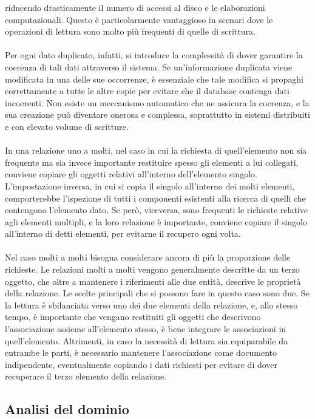 riducendo drasticamente il numero di accessi al disco e le elaborazioni computazionali. 
Questo è particolarmente vantaggioso in scenari
dove le operazioni di lettura sono molto più frequenti di quelle di scrittura.\\
\\
Per ogni dato duplicato, infatti, si introduce la complessità 
di dover garantire la coerenza di tali dati attraverso il sistema. 
Se un'informazione duplicata viene modificata in una delle sue occorrenze, 
è essenziale che tale modifica si propaghi correttamente a tutte le altre copie 
per evitare che il database contenga dati incoerenti.
Non esiste un meccanismo automatico che ne assicura la coerenza,
e la sua creazione può diventare onerosa e complessa, 
soprattutto in sistemi distribuiti e con elevato volume di scritture.\\
\\
In una relazione uno a molti, 
nel caso in cui la richiesta di quell'elemento non sia frequente 
ma sia invece importante restituire spesso gli elementi a lui collegati,
conviene copiare gli oggetti relativi all'interno dell'elemento singolo. 
L’impostazione inversa, in cui si copia il singolo all’interno dei molti elementi, 
comporterebbe l’ispezione di tutti i componenti esistenti alla ricerca di quelli che contengono l’elemento dato. 
Se però, viceversa, sono frequenti le richieste relative agli elementi multipli, e la loro relazione è importante, 
conviene copiare il singolo all'interno di detti elementi, per evitarne il recupero ogni volta.\\
\\
Nel caso molti a molti bisogna considerare ancora di più la proporzione delle richieste.
Le relazioni molti a molti vengono generalmente descritte da un terzo oggetto, 
che oltre a mantenere i riferimenti alle due entità,
descrive le proprietà della relazione.
Le scelte principali che si possono fare in questo caso sono due.
Se la lettura è sbilanciata verso uno dei due elementi della relazione,
e, allo stesso tempo, è importante che vengano restituiti gli oggetti 
che descrivono l'associazione assieme all'elemento stesso,
è bene integrare le associazioni in quell'elemento.
Altrimenti, in caso la necessità di lettura sia equiparabile da entrambe le parti,
è necessario mantenere l'associazione come documento indipendente, 
eventualmente copiando i dati richiesti per evitare 
di dover recuperare il terzo elemento della relazione.
\clearpage

\subsection{Analisi del dominio}

